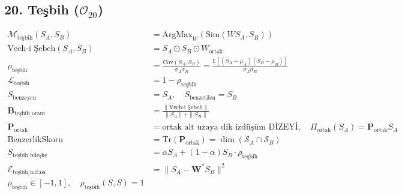 \documentclass[11pt, a4paper]{article}
\begin{document}
\subsection{20. Teşbih ($\mathcal{O}_{20}$)}
\begin{align}
\mathcal{M}_{\text{teşbih}}(S_A, S_B) &= \text{ArgMax}_{W} \left( \text{Sim}(W S_A, S_B) \right) \\
\text{Vech-i Şebeh}(S_A, S_B) &= S_A \odot S_B \odot W_{\text{ortak}} \\
\rho_{\text{teşbih}} &= \frac{\text{Cov}(S_A, S_B)}{\sigma_A \sigma_B} = \frac{\mathbb{E}[(S_A - \mu_A)(S_B - \mu_B)]}{\sigma_A \sigma_B} \\
\mathcal{L}_{\text{teşbih}} &= 1 - \rho_{\text{teşbih}} \\
S_{\text{benzeyen}} &= S_A, \quad S_{\text{benzetilen}} = S_B \\
\mathbf{B}_{\text{teşbih\_oranı}} &= \frac{\| \text{Vech-i Şebeh} \|}{\|S_A\| + \|S_B\|} \\
\mathbf{P}_{\text{ortak}} &= \text{ortak alt uzaya dik izdüşüm DİZEYİ}, \quad \Pi_{\text{ortak}}(S_A) = \mathbf{P}_{\text{ortak}} S_A \\
\text{BenzerlikSkoru} &= \text{Tr}(\mathbf{P}_{\text{ortak}}) = \dim(\mathcal{S}_A \cap \mathcal{S}_B) \\
S_{\text{teşbih\_bileşke}} &= \alpha S_A + (1-\alpha) S_B \cdot \rho_{\text{teşbih}} \\
\mathcal{E}_{\text{teşbih\_hatası}} &= \| S_A - \mathbf{W}^* S_B \|^2 \\
\rho_{\text{teşbih}} \in [-1, 1], \quad \rho_{\text{teşbih}}(S, S) = 1
\end{align}
\end{document}
